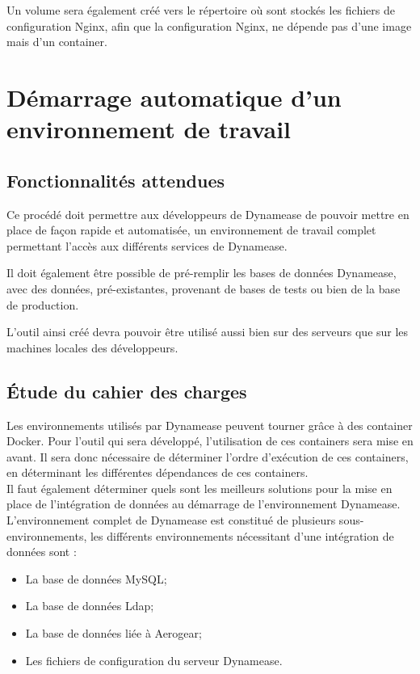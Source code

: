 Un volume sera également créé vers le répertoire où sont stockés les fichiers de configuration Nginx, afin que la configuration Nginx, ne dépende pas d'une image mais d'un container.

\section{Démarrage automatique d'un environnement de travail}

\subsection{Fonctionnalités attendues}

Ce procédé doit permettre aux développeurs de Dynamease de pouvoir mettre en place de façon rapide et automatisée, un environnement de travail complet permettant l'accès aux différents services de Dynamease. 

Il doit également être possible de pré-remplir les bases de données Dynamease, avec des données, pré-existantes, provenant de bases de tests ou bien de la base de production.

L'outil ainsi créé devra pouvoir être utilisé aussi bien sur des serveurs que sur les machines locales des développeurs. 

\subsection{Étude du cahier des charges}

Les environnements utilisés par Dynamease peuvent tourner grâce à des container Docker. Pour l'outil qui sera développé, l'utilisation de ces containers sera mise en avant. Il sera donc nécessaire de déterminer l'ordre d'exécution de ces containers, en déterminant les différentes dépendances de ces containers.\\

Il faut également déterminer quels sont les meilleurs solutions pour la mise en place de l'intégration de données au démarrage de l'environnement Dynamease. L'environnement complet de Dynamease est constitué de plusieurs sous-environnements, les différents environnements nécessitant d'une intégration de données sont :

\begin{itemize}
	\item La base de données MySQL;
	\item La base de données Ldap;
	\item La base de données liée à Aerogear;
	\item Les fichiers de configuration du serveur Dynamease.
\end{itemize}

